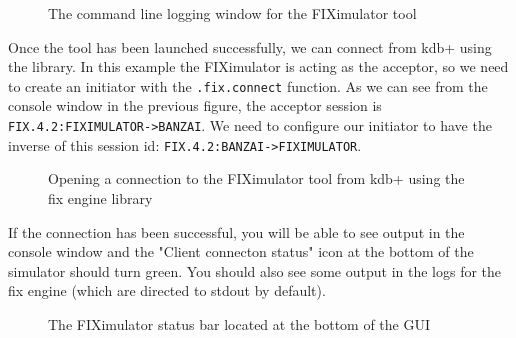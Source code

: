 \begin{figure}[H]
\centering
{}
\caption{The command line logging window for the FIXimulator tool}
\label{fig:fiximulator-startup}
\end{figure}

Once the tool has been launched successfully, we can connect from kdb+ using the library. In this example the FIXimulator is acting as the acceptor, so we need to create an initiator with the \texttt{.fix.connect} function. As we can see from the console window in the previous figure, the acceptor session is \texttt{FIX.4.2:FIXIMULATOR->BANZAI}. We need to configure our initiator to have the inverse of this session id: \texttt{FIX.4.2:BANZAI->FIXIMULATOR}.

\begin{figure}[H]
\caption{Opening a connection to the FIXimulator tool from kdb+ using the fix engine library}
\end{figure}

If the connection has been successful, you will be able to see output in the console window and the "Client connecton status" icon at the bottom of the simulator should turn green. You should also see some output in the logs for the fix engine (which are directed to stdout by default).

\begin{figure}[H]
\centering
{}
\caption{The FIXimulator status bar located at the bottom of the GUI}
\label{fig:fiximulator-status-bar}
\end{figure}

